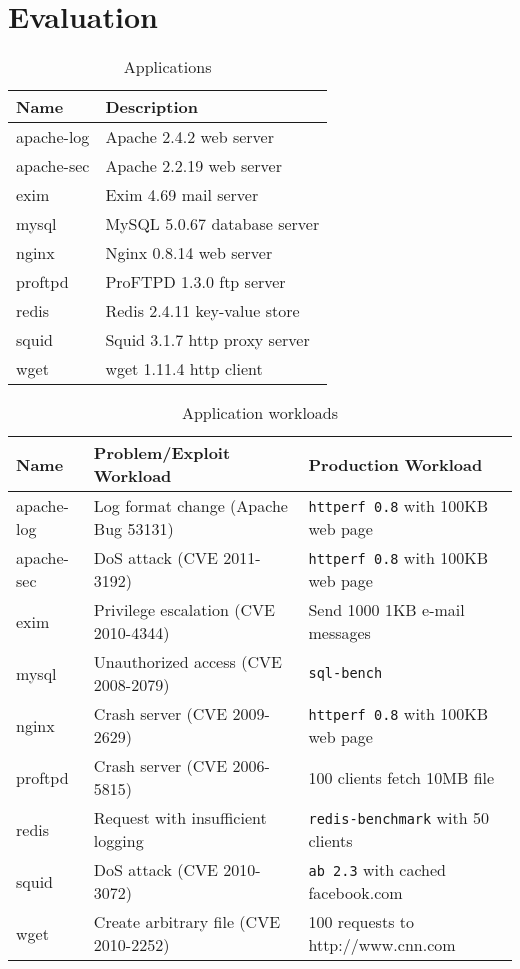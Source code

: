 \section{Evaluation}
\label{dora:sec:results}


\begin{table}
\centering
\begin{tabular}{|l|l|} \hline
{\bf Name}     & {\bf Description}             \\ \hline
		apache-log & Apache 2.4.2 web server       \\ \hline
		apache-sec & Apache 2.2.19 web server      \\ \hline
		exim       & Exim 4.69 mail server         \\ \hline
		mysql      & MySQL 5.0.67 database server  \\ \hline
		nginx      & Nginx 0.8.14 web server       \\ \hline
		proftpd    & ProFTPD 1.3.0 ftp server      \\ \hline
		redis      & Redis 2.4.11 key-value store  \\ \hline
		squid      & Squid 3.1.7 http proxy server \\ \hline
		wget       & wget 1.11.4 http client       \\ \hline
\end{tabular}
\caption{Applications}
\label{dora:tab:applications}
\end{table}

\begin{table}
\centering
\begin{tabular}{|l|l|l|} \hline
{\bf Name}     & {\bf Problem/Exploit Workload}        & {\bf Production Workload}             \\ \hline
		apache-log & Log format change (Apache Bug 53131)  & {\tt httperf 0.8} with 100KB web page \\ \hline
		apache-sec & DoS attack (CVE 2011-3192)            & {\tt httperf 0.8} with 100KB web page \\ \hline
		exim       & Privilege escalation (CVE 2010-4344)  & Send 1000 1KB e-mail messages         \\ \hline
		mysql      & Unauthorized access (CVE 2008-2079)   & {\tt sql-bench}                       \\ \hline
		nginx      & Crash server (CVE 2009-2629)          & {\tt httperf 0.8} with 100KB web page \\ \hline
		proftpd    & Crash server (CVE 2006-5815)          & 100 clients fetch 10MB file           \\ \hline
		redis      & Request with insufficient logging     & {\tt redis-benchmark} with 50 clients \\ \hline
		squid      & DoS attack (CVE 2010-3072)            & {\tt ab 2.3} with cached facebook.com \\ \hline
		wget       & Create arbitrary file (CVE 2010-2252) & 100 requests to http://www.cnn.com    \\ \hline
\end{tabular}
\caption{Application workloads}
\label{dora:tab:workloads}
\end{table}

